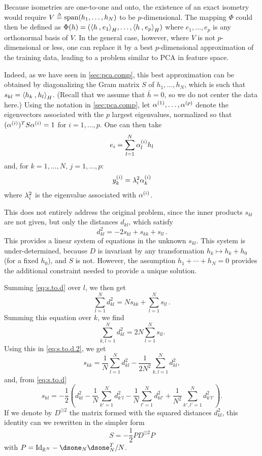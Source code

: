 Because isometries are one-to-one and onto, the existence of an exact isometry would require $V \stackrel{{\scriptscriptstyle \Delta}}{=} \mathrm{span}(h_1, \ldots, h_N)$ to be $p$-dimensional. The mapping $\Phi$ could then  be defined as $\Phi(h) = ({\langle {h}\mathbin{,} {e_1}\rangle}_H, \ldots, {\langle {h}\mathbin{,} {e_p}\rangle}_H)$ where $e_1, \ldots, e_p$ is any orthonormal basis of $V$. In the general case, however, where $V$ is not $p$-dimensional or less, one can  replace it by a best $p$-dimensional approximation of the training data, leading to a problem similar to PCA in feature space.

Indeed, as we have seen in  \cref{sec:pca.comp}, this best approximation can be obtained by diagonalizing the Gram matrix $S$ of $h_1, \ldots, h_N$, which is such that  $s_{kl} = {\langle {h_k}\mathbin{,} {h_l}\rangle}_H$. (Recall that we assume that $\bar h = 0$, so we do not center the data here.) Using the notation in \cref{sec:pca.comp}, let $\alpha^{(1)}, \ldots, \alpha^{(p)}$ denote the eigenvectors associated with the $p$ largest eigenvalues, normalized so that $(\alpha^{(i)})^TS\alpha^{(i)} = 1$ for $i=1, \ldots, p$. One can then take
\[
e_i = \sum_{l=1}^N \alpha_{l}^{(i)} h_l
\]
and, for $k=1, \ldots, N$, $j=1, \ldots, p$:
\begin{equation}
\label{eq:mds.sol}
y_{k}^{(i)} = \lambda_i^2 \alpha_{k}^{(i)}
\end{equation}
where $\lambda_i^2$ is the eigenvalue associated with $\alpha^{(i)}$.

This does not entirely address the original problem, since the inner products $s_{kl}$ are not given, but only the  distances $d_{kl}$, which satisfy
\begin{equation}
\label{eq:s.to.d}
 d_{kl }^2 = - 2 s_{kl} + s_{kk} +s_{ll}\,.
\end{equation}
This provides a linear system of equations in the unknown $s_{kl}$.  
This system is under-determined, because  $D$ is invariant by any transformation $h_k \mapsto h_k + h_0$ (for a fixed $h_0$), and $S$ is not. However, the assumption $h_1+\cdots+h_N=0$ provides the additional constraint needed to provide a unique solution. 

Summing  \cref{eq:s.to.d} over $l$, we then get 
\begin{equation}
\label{eq:s.to.d.2}
\sum_{l=1}^N d_{kl}^2 = Ns_{kk} + \sum_{l=1}^N s_{ll}\,.
\end{equation}
Summing this equation over $k$, we find 
\[
\sum_{k,l=1}^N d_{kl}^2 = 2N \sum_{l=1}^N s_{ll}.
\]
Using this in \cref{eq:s.to.d.2}, we get 
\[
s_{kk} = \frac1N\sum_{l=1}^N d_{kl}^2 - \frac1{2N^2} \sum_{k,l=1}^N d_{kl}^2,
\]
and, from \cref{eq:s.to.d}
\[
s_{kl} = -\frac12\left(d_{kl}^2 - \frac1N\sum_{k'=1}^N d_{k'l}^2 - \frac1N\sum_{l'=1}^N d_{kl'}^2 + \frac1{N^2} \sum_{k',l'=1}^N d_{k'l'}^2\right).
\]
If we denote by $D^{\odot 2}$ the matrix formed with the squared distances $d^2_{kl}$, this identity can we rewritten in the simpler form  
\begin{equation}
\label{eq:dissim.sim}
S = -\frac12 P D^{\odot 2} P
\end{equation}
with $P = \Id[N] -\dsone_N \dsone_N^T/N$.


